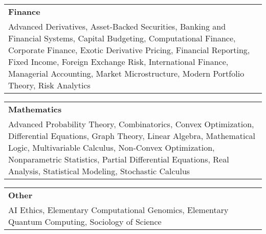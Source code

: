 \documentclass[10pt]{article}
\newcommand{\tabularxwidth}{\textwidth}
\begin{document}
    
        \begin{tabularx}{\tabularxwidth}{X}
            \textbf{Finance} \\
            
    
            Advanced Derivatives, 
            Asset-Backed Securities, 
            Banking and Financial Systems, 
            Capital Budgeting, 
            Computational Finance, 
            Corporate Finance, 
            Exotic Derivative Pricing, 
            Financial Reporting, 
            Fixed Income, 
            Foreign Exchange Risk, 
            International Finance, 
            Managerial Accounting, 
            Market Microstructure, 
            Modern Portfolio Theory, 
            Risk Analytics \\
        \end{tabularx}

        
            \vspace{.5em}
        

    
        \begin{tabularx}{\tabularxwidth}{X}
            \textbf{Mathematics} \\
            
    
            Advanced Probability Theory, 
            Combinatorics, 
            Convex Optimization, 
            Differential Equations, 
            Graph Theory, 
            Linear Algebra, 
            Mathematical Logic, 
            Multivariable Calculus, 
            Non-Convex Optimization, 
            Nonparametric Statistics, 
            Partial Differential Equations, 
            Real Analysis, 
            Statistical Modeling, 
            Stochastic Calculus \\
        \end{tabularx}

        
            \vspace{.5em}
        

    
        \begin{tabularx}{\tabularxwidth}{X}
            \textbf{Other} \\
            
    
            AI Ethics, 
            Elementary Computational Genomics, 
            Elementary Quantum Computing, 
            Sociology of Science \\
        \end{tabularx}
\end{document}
